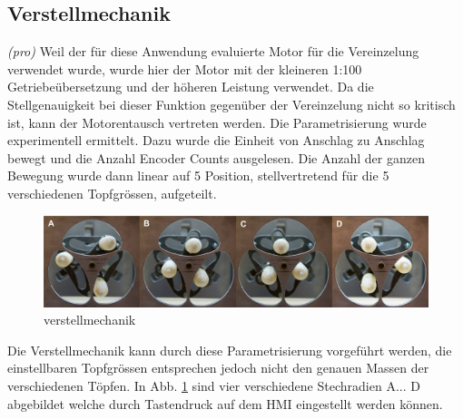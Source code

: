 \subsection{Verstellmechanik} \label{sec:Inbetriebnahme_Verstellmechanik}
\textit{(pro)} Weil der für diese Anwendung evaluierte Motor für die Vereinzelung verwendet wurde, wurde hier der Motor mit der kleineren 1:100 Getriebeübersetzung und der höheren Leistung verwendet. Da die Stellgenauigkeit bei dieser Funktion gegenüber der Vereinzelung nicht so kritisch ist, kann der Motorentausch vertreten werden. Die Parametrisierung wurde experimentell ermittelt. Dazu wurde die Einheit von Anschlag zu Anschlag bewegt und die Anzahl Encoder Counts ausgelesen. Die Anzahl der ganzen Bewegung wurde dann linear auf 5 Position, stellvertretend für die 5 verschiedenen Topfgrössen, aufgeteilt. 

\begin{figure}[H]
	\includegraphics[width=1\textwidth]{Illustrationen/7-Inbetriebnahme_und_Kalibration/verstellmechanik_1.jpg}
	\caption{verstellmechanik}
	\label{fig:verstellmechanik}
\end{figure}

Die Verstellmechanik kann durch diese Parametrisierung vorgeführt werden, die einstellbaren Topfgrössen entsprechen jedoch nicht den genauen Massen der verschiedenen Töpfen. In Abb. \ref{fig:verstellmechanik} sind vier verschiedene Stechradien A... D abgebildet welche durch Tastendruck auf dem HMI eingestellt werden können.